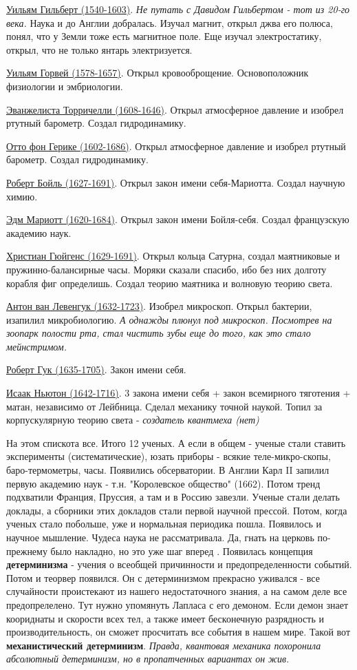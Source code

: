 \underline{Уильям Гильберт (1540-1603)}. \textit{Не путать с Давидом Гильбертом - тот из 20-го века.} Наука и до Англии добралась. Изучал магнит, открыл джва его полюса, понял, что у Земли тоже есть магнитное поле. Еще изучал электростатику, открыл, что не только янтарь электризуется.

\underline{Уильям Горвей (1578-1657)}. Открыл кровооброщение. Основоположник физиологии и эмбриологии.

\underline{Эванжелиста Торричелли (1608-1646)}. Открыл атмосферное давление и изобрел ртутный барометр. Создал гидродинамику.

\underline{Отто фон Герике (1602-1686)}. Открыл атмосферное давление и изобрел ртутный барометр. Создал гидродинамику.

\underline{Роберт Бойль (1627-1691)}. Открыл закон имени себя-Мариотта. Создал научную химию.

\underline{Эдм Мариотт (1620-1684)}. Открыл закон имени Бойля-себя. Создал французскую академию наук.

\underline{Христиан Гюйгенс (1629-1691)}. Открыл кольца Сатурна, создал маятниковые и пружинно-балансирные часы. Моряки сказали спасибо, ибо без них долготу корабля фиг определишь. Создал теорию маятника и волновую теорию света.

\underline{Антон ван Левенгук (1632-1723)}. Изобрел микроскоп. Открыл бактерии, изапилил микробиологию. \textit{А однажды плюнул под микроскоп. Посмотрев на зоопарк полости рта, стал чистить зубы еще до того, как это стало мейнстримом.}

\underline{Роберт Гук (1635-1705)}. Закон имени себя.

\underline{Исаак Ньютон (1642-1716)}. 3 закона имени себя + закон всемирного тяготения + матан, независимо от Лейбница. Сделал механику точной наукой. Топил за корпускулярную теорию света - \textit{создатель квантмеха (нет)}
 
На этом спискота все. Итого 12 ученых. А если в общем - ученые стали ставить эксперименты (систематические), юзать приборы - всякие теле-микро-скопы, баро-термометры, часы. Появились обсерватории. В Англии Карл II запилил первую академию наук - т.н. "Королевское общество" (1662). Потом тренд подхватили Франция, Пруссия, а там и в Россию завезли. Ученые стали делать доклады, а сборники этих докладов стали первой научной прессой. Потом, когда ученых стало побольше, уже и нормальная периодика пошла. Появилось и научное мышление. Чудеса наука не рассматривала. Да, гнать на церковь по-прежнему было накладно, но это уже шаг вперед . Появилась концепция \textbf{детерминизма} - учения о всеобщей причинности и предопределенности событий. Потом и теорвер появился. Он с детерминизмом прекрасно уживался - все случайности проистекают из нашего недостаточного знания, а на самом деле все предопрелелено. Тут нужно упомянуть Лапласа с его демоном. Если демон знает коориднаты и скорости всех тел, а также имеет бесконечную разрядность и производительность, он сможет просчитать все события в нашем мире. Такой вот \textbf{механистический детерминизм}. \textit{Правда, квантовая механика похоронила абсолютный детерминизм, но в пропатченных вариантах он жив}.

